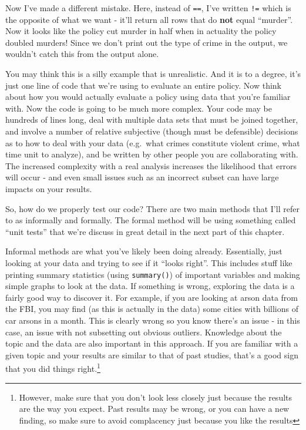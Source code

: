 \documentclass[
  12pt,
  openany]{book}
\newenvironment{Shaded}{\begin{snugshade}}{\end{snugshade}}
\newcommand{\CommentTok}[1]{\textcolor[rgb]{0.37,0.37,0.37}{\textit{#1}}}
\newcommand{\FunctionTok}[1]{\textcolor[rgb]{0,0,0}{#1}}
\newcommand{\NormalTok}[1]{#1}
\newcommand{\SpecialCharTok}[1]{\textcolor[rgb]{0,0,0}{#1}}
\newcommand{\StringTok}[1]{\textcolor[rgb]{0.5,0.5,0.5}{#1}}
\begin{document}
Now I've made a different mistake. Here, instead of \texttt{==}, I've written \texttt{!=} which is the opposite of what we want - it'll return all rows that do \textbf{not} equal ``murder''. Now it looks like the policy cut murder in half when in actuality the policy doubled murders! Since we don't print out the type of crime in the output, we wouldn't catch this from the output alone.

\begin{Shaded}
\end{Shaded}

You may think this is a silly example that is unrealistic. And it is to a degree, it's just one line of code that we're using to evaluate an entire policy. Now think about how you would actually evaluate a policy using data that you're familiar with. Now the code is going to be much more complex. Your code may be hundreds of lines long, deal with multiple data sets that must be joined together, and involve a number of relative subjective (though must be defensible) decisions as to how to deal with your data (e.g.~what crimes constitute violent crime, what time unit to analyze), and be written by other people you are collaborating with. The increased complexity with a real analysis increases the likelihood that errors will occur - and even small issues such as an incorrect subset can have large impacts on your results.

So, how do we properly test our code? There are two main methods that I'll refer to as informally and formally. The formal method will be using something called ``unit tests'' that we're discuss in great detail in the next part of this chapter.

Informal methods are what you've likely been doing already. Essentially, just looking at your data and trying to see if it ``looks right''. This includes stuff like printing summary statistics (using \texttt{summary()}) of important variables and making simple graphs to look at the data. If something is wrong, exploring the data is a fairly good way to discover it. For example, if you are looking at arson data from the FBI, you may find (as this is actually in the data) some cities with billions of car arsons in a month. This is clearly wrong so you know there's an issue - in this case, an issue with not subsetting out obvious outliers. Knowledge about the topic and the data are also important in this approach. If you are familiar with a given topic and your results are similar to that of past studies, that's a good sign that you did things right.\footnote{However, make sure that you don't look less closely just because the results are the way you expect. Past results may be wrong, or you can have a new finding, so make sure to avoid complacency just because you like the results}
\end{document}
